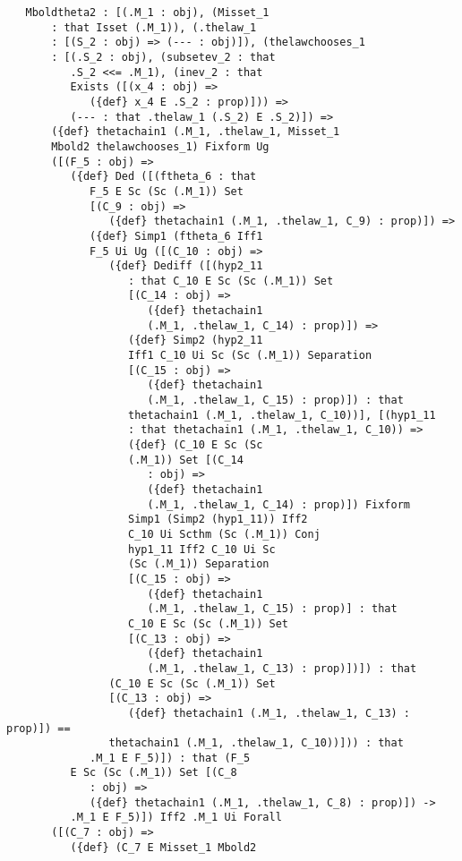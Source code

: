 \documentclass[12pt]{article}
\begin{document}
\begin{verbatim}
   Mboldtheta2 : [(.M_1 : obj), (Misset_1 
       : that Isset (.M_1)), (.thelaw_1 
       : [(S_2 : obj) => (--- : obj)]), (thelawchooses_1 
       : [(.S_2 : obj), (subsetev_2 : that 
          .S_2 <<= .M_1), (inev_2 : that 
          Exists ([(x_4 : obj) => 
             ({def} x_4 E .S_2 : prop)])) => 
          (--- : that .thelaw_1 (.S_2) E .S_2)]) => 
       ({def} thetachain1 (.M_1, .thelaw_1, Misset_1 
       Mbold2 thelawchooses_1) Fixform Ug 
       ([(F_5 : obj) => 
          ({def} Ded ([(ftheta_6 : that 
             F_5 E Sc (Sc (.M_1)) Set 
             [(C_9 : obj) => 
                ({def} thetachain1 (.M_1, .thelaw_1, C_9) : prop)]) => 
             ({def} Simp1 (ftheta_6 Iff1 
             F_5 Ui Ug ([(C_10 : obj) => 
                ({def} Dediff ([(hyp2_11 
                   : that C_10 E Sc (Sc (.M_1)) Set 
                   [(C_14 : obj) => 
                      ({def} thetachain1 
                      (.M_1, .thelaw_1, C_14) : prop)]) => 
                   ({def} Simp2 (hyp2_11 
                   Iff1 C_10 Ui Sc (Sc (.M_1)) Separation 
                   [(C_15 : obj) => 
                      ({def} thetachain1 
                      (.M_1, .thelaw_1, C_15) : prop)]) : that 
                   thetachain1 (.M_1, .thelaw_1, C_10))], [(hyp1_11 
                   : that thetachain1 (.M_1, .thelaw_1, C_10)) => 
                   ({def} (C_10 E Sc (Sc 
                   (.M_1)) Set [(C_14 
                      : obj) => 
                      ({def} thetachain1 
                      (.M_1, .thelaw_1, C_14) : prop)]) Fixform 
                   Simp1 (Simp2 (hyp1_11)) Iff2 
                   C_10 Ui Scthm (Sc (.M_1)) Conj 
                   hyp1_11 Iff2 C_10 Ui Sc 
                   (Sc (.M_1)) Separation 
                   [(C_15 : obj) => 
                      ({def} thetachain1 
                      (.M_1, .thelaw_1, C_15) : prop)] : that 
                   C_10 E Sc (Sc (.M_1)) Set 
                   [(C_13 : obj) => 
                      ({def} thetachain1 
                      (.M_1, .thelaw_1, C_13) : prop)])]) : that 
                (C_10 E Sc (Sc (.M_1)) Set 
                [(C_13 : obj) => 
                   ({def} thetachain1 (.M_1, .thelaw_1, C_13) : prop)]) == 
                thetachain1 (.M_1, .thelaw_1, C_10))])) : that 
             .M_1 E F_5)]) : that (F_5 
          E Sc (Sc (.M_1)) Set [(C_8 
             : obj) => 
             ({def} thetachain1 (.M_1, .thelaw_1, C_8) : prop)]) -> 
          .M_1 E F_5)]) Iff2 .M_1 Ui Forall 
       ([(C_7 : obj) => 
          ({def} (C_7 E Misset_1 Mbold2 

\end{verbatim}
\end{document}
